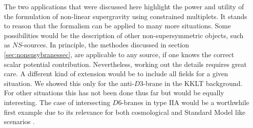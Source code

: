 \documentclass[a4paper,12pt]{report}
\begin{document}
The two applications that were discussed here highlight the power and utility of the formulation of non-linear supergravity using constrained multiplets. It stands to reason that the formalism can be applied to many more situations. Some possibilities would be the description of other non-supersymmetric objects, such as $NS$-sources. In principle, the methodes discussed in section \ref{sec:nonsusybranessec}, are applicable to any source, if one knows the correct scalar potential contribution. Nevertheless, working out the details requires great care. A different kind of extension would be to include all fields for a given situation. We showed this only for the anti-$D3$-brane in the KKLT background. For other situations this has not been done thus far but would be equally interesting. The case of intersecting $D6$-branes in type IIA would be a worthwhile first example due to its relevance for both cosmological and Standard Model like scenarios \cite{Grana:2005jc,Douglas:2006es,Blumenhagen:2006ci,Blumenhagen:2005mu}.\\
\end{document}
